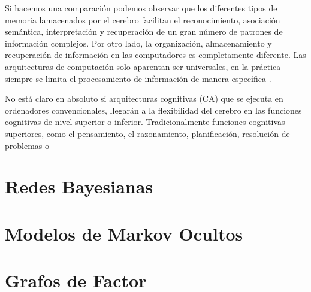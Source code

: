 Si hacemos una comparaci\'{o}n podemos observar que los diferentes tipos de memoria lamacenados por el cerebro facilitan el reconocimiento, asociaci\'{o}n sem\'{a}ntica, interpretaci\'{o}n y recuperaci\'{o}n de un gran n\'{u}mero de patrones de informaci\'{o}n complejos. Por otro lado, la organizaci\'{o}n, almacenamiento y recuperaci\'{o}n de informaci\'{o}n en las computadores es completamente diferente. Las arquitecturas de computaci\'{o}n solo aparentan ser universales, en la pr\'{a}ctica siempre se limita el procesamiento de informaci\'{o}n de manera espec\'{i}fica \cite{duch2008cognitive}. 
 
 
 No está claro en absoluto si arquitecturas cognitivas (CA) que se ejecuta en
ordenadores convencionales, llegarán a la flexibilidad del cerebro en las funciones cognitivas de nivel superior o inferior.
Tradicionalmente funciones cognitivas superiores, como el pensamiento, el razonamiento, planificación, resolución de problemas o
\section{Redes Bayesianas}
\section{Modelos de Markov Ocultos}
\section{Grafos de Factor}